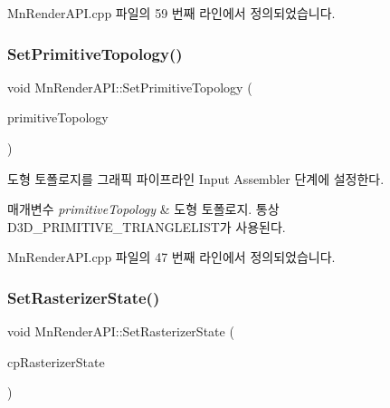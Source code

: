 Mn\+Render\+A\+P\+I.\+cpp 파일의 59 번째 라인에서 정의되었습니다.

\mbox{\label{class_m_n_l_1_1_mn_render_a_p_i_ade0c9d037798ea2ff940c9eafda403b7}} 
\subsubsection{\texorpdfstring{Set\+Primitive\+Topology()}{SetPrimitiveTopology()}}
{\footnotesize\ttfamily void Mn\+Render\+A\+P\+I\+::\+Set\+Primitive\+Topology (\begin{DoxyParamCaption}\item[{const D3\+D\+\_\+\+P\+R\+I\+M\+I\+T\+I\+V\+E\+\_\+\+T\+O\+P\+O\+L\+O\+GY \&}]{primitive\+Topology }\end{DoxyParamCaption})}



도형 토폴로지를 그래픽 파이프라인 Input Assembler 단계에 설정한다. 


\begin{DoxyParams}{매개변수}
{\em primitive\+Topology} & 도형 토폴로지. 통상 D3\+D\+\_\+\+P\+R\+I\+M\+I\+T\+I\+V\+E\+\_\+\+T\+R\+I\+A\+N\+G\+L\+E\+L\+I\+S\+T가 사용된다. \\
\hline
\end{DoxyParams}


Mn\+Render\+A\+P\+I.\+cpp 파일의 47 번째 라인에서 정의되었습니다.

\mbox{\label{class_m_n_l_1_1_mn_render_a_p_i_a6bda2a793330625a9afd6e488decd198}} 
\subsubsection{\texorpdfstring{Set\+Rasterizer\+State()}{SetRasterizerState()}}
{\footnotesize\ttfamily void Mn\+Render\+A\+P\+I\+::\+Set\+Rasterizer\+State (\begin{DoxyParamCaption}\item[{const \hyperlink{namespace_m_n_l_aa6c2682c64c5b58c458c36bb424f1e56}{C\+P\+D3\+D\+Rasterizer\+State} \&}]{cp\+Rasterizer\+State }\end{DoxyParamCaption})}



